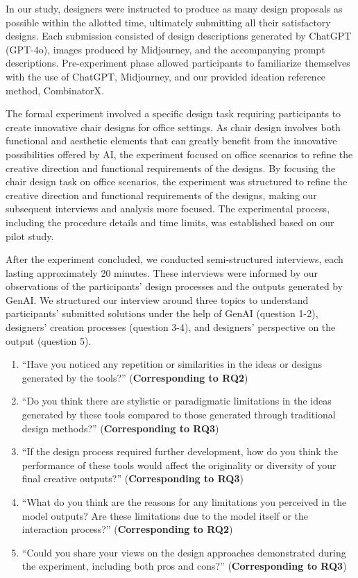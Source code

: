 In our study, designers were instructed to produce as many design proposals as possible within the allotted time, ultimately submitting all their satisfactory designs. Each submission consisted of design descriptions generated by ChatGPT (GPT-4o), images produced by Midjourney, and the accompanying prompt descriptions. Pre-experiment phase allowed participants to familiarize themselves with the use of ChatGPT, Midjourney, and our provided ideation reference method, CombinatorX. 

The formal experiment involved a specific design task requiring participants to create innovative chair designs for office settings. As chair design involves both functional and aesthetic elements that can greatly benefit from the innovative possibilities offered by AI, the experiment focused on office scenarios to refine the creative direction and functional requirements of the designs. By focusing the chair design task on office scenarios, the experiment was structured to refine the creative direction and functional requirements of the designs, making our subsequent interviews and analysis more focused. The experimental process, including the procedure details and time limits, was established based on our pilot study. 

After the experiment concluded, we conducted semi-structured interviews, each lasting approximately 20 minutes. These interviews were informed by our observations of the participants’ design processes and the outputs generated by GenAI. We structured our interview around three topics to understand participants' submitted solutions under the help of GenAI (question 1-2), designers' creation processes (question 3-4), and designers' perspective on the output (question 5).

\begin{enumerate}
    \item ``Have you noticed any repetition or similarities in the ideas or designs generated by the tools?'' (\textbf{Corresponding to RQ2})
    \item ``Do you think there are stylistic or paradigmatic limitations in the ideas generated by these tools compared to those generated through traditional design methods?'' (\textbf{Corresponding to RQ3})
    \item ``If the design process required further development, how do you think the performance of these tools would affect the originality or diversity of your final creative outputs?'' (\textbf{Corresponding to RQ3})
    \item ``What do you think are the reasons for any limitations you perceived in the model outputs? Are these limitations due to the model itself or the interaction process?'' (\textbf{Corresponding to RQ2})
    \item ``Could you share your views on the design approaches demonstrated during the experiment, including both pros and cons?'' (\textbf{Corresponding to RQ3})
\end{enumerate}

